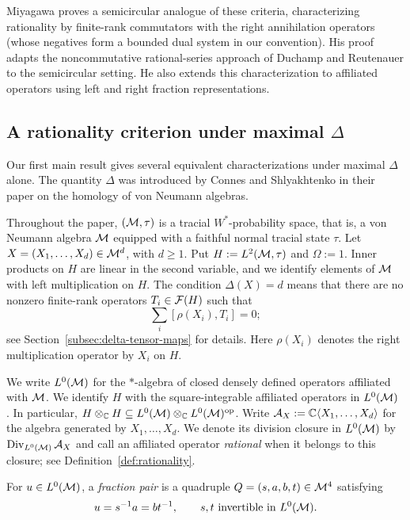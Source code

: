 Miyagawa \cite[Theorems 3.1 and 4.5]{Miy22} proves a semicircular analogue of these criteria, characterizing rationality by finite-rank commutators with the right annihilation operators (whose negatives form a bounded dual system in our convention).
His proof adapts the noncommutative rational-series approach of Duchamp and Reutenauer to the semicircular setting.
He also extends this characterization to affiliated operators using left and right fraction representations.

\subsection{A rationality criterion under maximal \texorpdfstring{$\Delta$}{Delta}}
Our first main result gives several equivalent characterizations under maximal $\Delta$ alone.
The quantity $\Delta$ was introduced by Connes and Shlyakhtenko in their paper \cite{CS05} on the homology of von Neumann algebras.

Throughout the paper, $(\mathcal M,\tau)$ is a tracial $W^*$-probability space, that is, a von Neumann algebra $\mathcal M$ equipped with a faithful normal tracial state $\tau$.
Let $X=(X_1,\ldots,X_d)\in\mathcal M^d$, with $d\geq1$.
Put $H:=L^2(\mathcal M,\tau)$ and $\Omega:=1$.
Inner products on $H$ are linear in the second variable, and we identify elements of $\mathcal M$ with left multiplication on $H$.
The condition $\Delta(X)=d$ means that there are no nonzero finite-rank operators $T_i\in\mathcal F(H)$ such that
\[\sum_i[\rho(X_i),T_i]=0;\]
see Section~\ref{subsec:delta-tensor-maps} for details.
Here $\rho(X_i)$ denotes the right multiplication operator by $X_i$ on $H$.

We write $L^0(\mathcal M)$ for the $*$-algebra of closed densely defined operators affiliated with $\mathcal M$.
We identify $H$ with the square-integrable affiliated operators in $L^0(\mathcal M)$ \cite[Theorem~7.3.2]{AP18}.
In particular, $H\otimes_{\mathbb C}H\subseteq L^0(\mathcal M)\otimes_{\mathbb C}L^0(\mathcal M)^{\mathrm{op}}$.
Write $\mathcal A_X:=\mathbb C\langle X_1,\ldots,X_d\rangle$ for the algebra generated by $X_1,\ldots,X_d$.
We denote its division closure in $L^0(\mathcal M)$ by $\operatorname{Div}_{L^0(\mathcal M)}\mathcal A_X$ and call an affiliated operator \emph{rational} when it belongs to this closure; see Definition~\ref{def:rationality}.

\begin{definition}\label{def:fraction-pair}
For $u\in L^0(\mathcal M)$, a \emph{fraction pair} is a quadruple $Q=(s,a,b,t)\in\mathcal M^4$ satisfying
\begin{equation}
 u=s^{-1}a=bt^{-1},\qquad s,t\text{ invertible in }L^0(\mathcal M).
 \label{eq:fractions}
\end{equation}
\end{definition}

